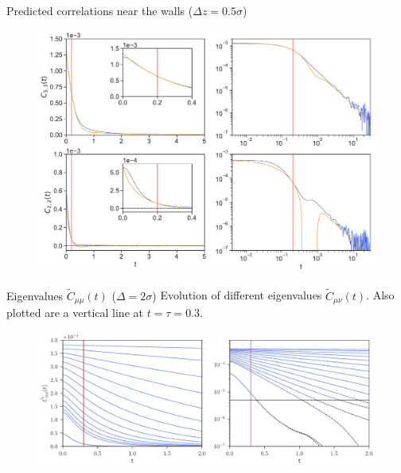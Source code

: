 \documentclass{beamer}
\begin{document}
\begin{frame}{Predicted correlations near the walls ($\Delta z=0.5\sigma$)}
\begin{figure}[h!]
\includegraphics[width=\linewidth]{Predictions-WALLS-66nodes-defense}
\end{figure}
\end{frame}

\begin{frame}{Eigenvalues $\tilde{C}_{\mu\mu}(t)$ ($\Delta=2\sigma$)}
Evolution of different eigenvalues $\tilde{C}_{\mu\nu}(t)$. Also  plotted are  a vertical line  at $t=\tau=0.3$.
\begin{figure}[h!]
  \includegraphics[width=\linewidth]{CtRec-WALLS-17nodes-exp}
\end{figure}
\end{frame}
\end{document}
